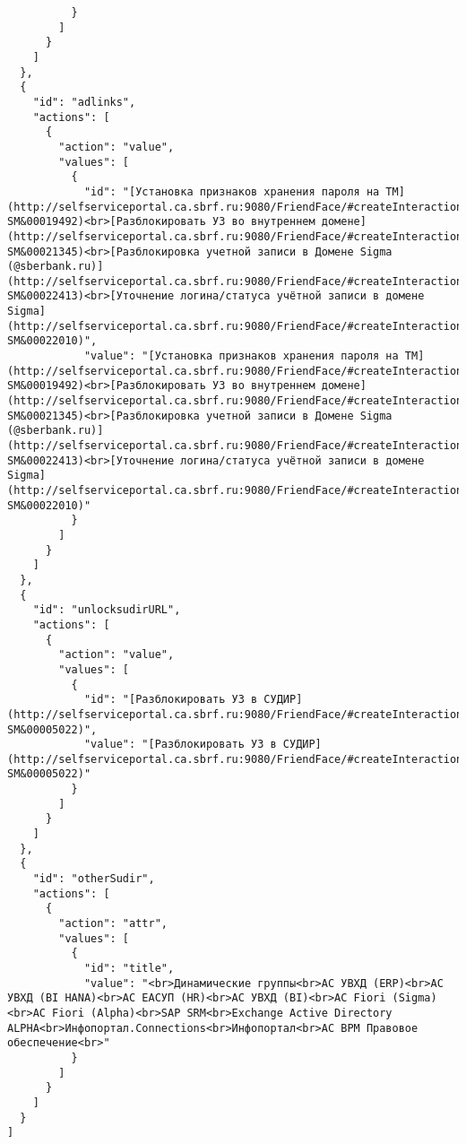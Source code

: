 \documentclass[../index.tex]{subfiles}
\begin{document}
\begin{verbatim}
          }
        ]
      }
    ]
  },
  {
    "id": "adlinks",
    "actions": [
      {
        "action": "value",
        "values": [
          {
            "id": "[Установка признаков хранения пароля на ТМ](http://selfserviceportal.ca.sbrf.ru:9080/FriendFace/#createInteraction?SM&00019492)<br>[Разблокировать УЗ во внутреннем домене](http://selfserviceportal.ca.sbrf.ru:9080/FriendFace/#createInteraction?SM&00021345)<br>[Разблокировка учетной записи в Домене Sigma (@sberbank.ru)](http://selfserviceportal.ca.sbrf.ru:9080/FriendFace/#createInteraction?SM&00022413)<br>[Уточнение логина/статуса учётной записи в домене Sigma](http://selfserviceportal.ca.sbrf.ru:9080/FriendFace/#createInteraction?SM&00022010)",
            "value": "[Установка признаков хранения пароля на ТМ](http://selfserviceportal.ca.sbrf.ru:9080/FriendFace/#createInteraction?SM&00019492)<br>[Разблокировать УЗ во внутреннем домене](http://selfserviceportal.ca.sbrf.ru:9080/FriendFace/#createInteraction?SM&00021345)<br>[Разблокировка учетной записи в Домене Sigma (@sberbank.ru)](http://selfserviceportal.ca.sbrf.ru:9080/FriendFace/#createInteraction?SM&00022413)<br>[Уточнение логина/статуса учётной записи в домене Sigma](http://selfserviceportal.ca.sbrf.ru:9080/FriendFace/#createInteraction?SM&00022010)"
          }
        ]
      }
    ]
  },
  {
    "id": "unlocksudirURL",
    "actions": [
      {
        "action": "value",
        "values": [
          {
            "id": "[Разблокировать УЗ в СУДИР](http://selfserviceportal.ca.sbrf.ru:9080/FriendFace/#createInteraction?SM&00005022)",
            "value": "[Разблокировать УЗ в СУДИР](http://selfserviceportal.ca.sbrf.ru:9080/FriendFace/#createInteraction?SM&00005022)"
          }
        ]
      }
    ]
  },
  {
    "id": "otherSudir",
    "actions": [
      {
        "action": "attr",
        "values": [
          {
            "id": "title",
            "value": "<br>Динамические группы<br>АС УВХД (ERP)<br>АС УВХД (BI HANA)<br>АС ЕАСУП (HR)<br>АС УВХД (BI)<br>АС Fiori (Sigma)<br>АС Fiori (Alpha)<br>SAP SRM<br>Exchange Active Directory ALPHA<br>Инфопортал.Connections<br>Инфопортал<br>АС BPM Правовое обеспечение<br>"
          }
        ]
      }
    ]
  }
]
\end{verbatim}
\end{document}
